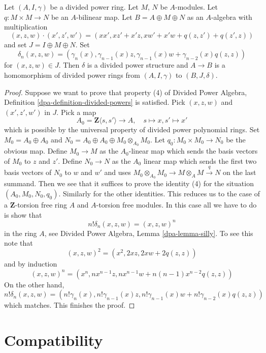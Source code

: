 \begin{lemma}
\label{lemma-divided-power-second-order-thickening}
Let $(A, I, \gamma)$ be a divided power ring. Let $M$, $N$ be $A$-modules.
Let $q : M \times M \to N$ be an $A$-bilinear map.
Let $B = A \oplus M \oplus N$ as an $A$-algebra with multiplication
$$
(x, z, w)\cdot (x', z', w') = (xx', xz' + x'z, xw' + x'w + q(z, z') + q(z', z))
$$
and set $J = I \oplus M \oplus N$. Set
$$
\delta_n(x, z, w) = (\gamma_n(x), \gamma_{n - 1}(x)z,
\gamma_{n - 1}(x)w + \gamma_{n - 2}(x)q(z, z))
$$
for $(x, z, w) \in J$.
Then $\delta$ is a divided power structure and
$A \to B$ is a homomorphism of divided power rings from
$(A, I, \gamma)$ to $(B, J, \delta)$.
\end{lemma}

\begin{proof}
Suppose we want to prove that property (4) of
Divided Power Algebra, Definition \ref{dpa-definition-divided-powers}
is satisfied. Pick $(x, z, w)$ and $(x', z', w')$ in $J$.
Pick a map
$$
A_0 = \mathbf{Z}\langle s, s'\rangle \longrightarrow A,\quad
s \longmapsto x,
s' \longmapsto x'
$$
which is possible by the universal property of divided power
polynomial rings. Set $M_0 = A_0 \oplus A_0$ and
$N_0 = A_0 \oplus A_0 \oplus M_0 \otimes_{A_0} M_0$.
Let $q_0 : M_0 \times M_0 \to N_0$ be the obvious map.
Define $M_0 \to M$ as the $A_0$-linear map which sends
the basis vectors of $M_0$ to $z$ and $z'$. Define $N_0 \to N$
as the $A_0$ linear map which sends the first two basis vectors
of $N_0$ to $w$ and $w'$ and uses
$M_0 \otimes_{A_0} M_0 \to M \otimes_A M \xrightarrow{q} N$
on the last summand. Then we see that it suffices to prove the
identity (4) for the situation $(A_0, M_0, N_0, q_0)$.
Similarly for the other identities. This reduces us to the case
of a $\mathbf{Z}$-torsion free ring $A$ and $A$-torsion free modules.
In this case all we have to do is show that
$$
n! \delta_n(x, z, w) = (x, z, w)^n
$$
in the ring $A$, see Divided Power Algebra, Lemma \ref{dpa-lemma-silly}.
To see this note that
$$
(x, z, w)^2 = (x^2, 2xz, 2xw + 2q(z, z))
$$
and by induction
$$
(x, z, w)^n = (x^n, nx^{n - 1}z, nx^{n - 1}w + n(n - 1)x^{n - 2}q(z, z))
$$
On the other hand,
$$
n! \delta_n(x, z, w) = (n!\gamma_n(x), n!\gamma_{n - 1}(x)z,
n!\gamma_{n - 1}(x)w + n!\gamma_{n - 2}(x) q(z, z))
$$
which matches. This finishes the proof.
\end{proof}




\section{Compatibility}
\label{section-compatibility}

